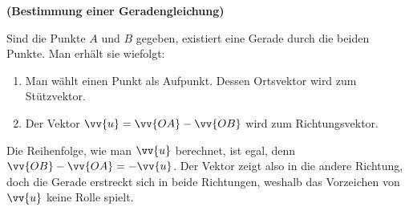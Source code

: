 \documentclass[ngerman, 12pt]{nssheetxea}
\begin{document}
\begin{theorem} \textbf{(Bestimmung einer Geradengleichung)} \par
Sind die Punkte $A$ und $B$ gegeben, existiert eine Gerade durch die beiden Punkte. Man erhält sie wiefolgt:
\begin{enumerate}
\item Man wählt einen Punkt als Aufpunkt. Dessen Ortsvektor wird zum Stützvektor.
\item Der Vektor $\vv{u}=\vv{OA}-\vv{OB}$ wird zum Richtungsvektor.
\end{enumerate}
Die Reihenfolge, wie man $\vv{u}$ berechnet, ist egal, denn $\vv{OB}-\vv{OA}=-\vv{u}$. Der Vektor zeigt also in die andere Richtung, doch die Gerade erstreckt sich in beide Richtungen, weshalb das Vorzeichen von $\vv{u}$ keine Rolle spielt.
\end{theorem}
\end{document}
